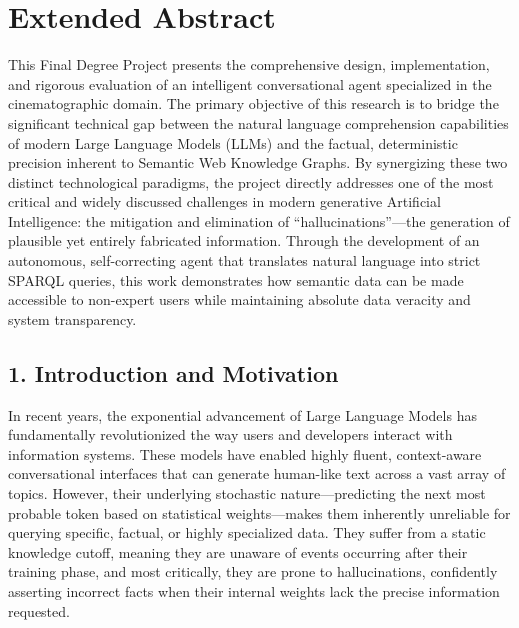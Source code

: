 

\chapter*{Extended Abstract}

This Final Degree Project presents the comprehensive design, implementation, and rigorous evaluation of an intelligent conversational agent specialized in the cinematographic domain. The primary objective of this research is to bridge the significant technical gap between the natural language comprehension capabilities of modern Large Language Models (LLMs) and the factual, deterministic precision inherent to Semantic Web Knowledge Graphs. By synergizing these two distinct technological paradigms, the project directly addresses one of the most critical and widely discussed challenges in modern generative Artificial Intelligence: the mitigation and elimination of ``hallucinations''—the generation of plausible yet entirely fabricated information. Through the development of an autonomous, self-correcting agent that translates natural language into strict SPARQL queries, this work demonstrates how semantic data can be made accessible to non-expert users while maintaining absolute data veracity and system transparency.

\section*{1. Introduction and Motivation}

In recent years, the exponential advancement of Large Language Models has fundamentally revolutionized the way users and developers interact with information systems. These models have enabled highly fluent, context-aware conversational interfaces that can generate human-like text across a vast array of topics. However, their underlying stochastic nature—predicting the next most probable token based on statistical weights—makes them inherently unreliable for querying specific, factual, or highly specialized data. They suffer from a static knowledge cutoff, meaning they are unaware of events occurring after their training phase, and most critically, they are prone to hallucinations, confidently asserting incorrect facts when their internal weights lack the precise information requested.

